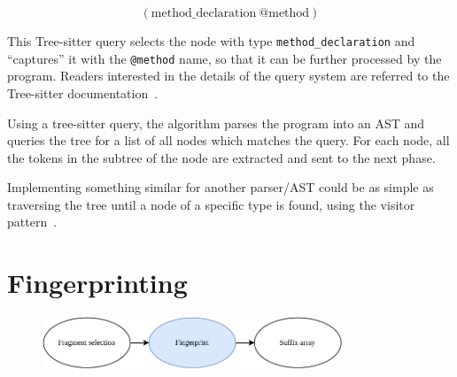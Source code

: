 \begin{equation}
    (\mathrm{method\_declaration\ } \text{@method})
\end{equation}

This Tree-sitter query selects the node with type \verb|method_declaration| and
``captures'' it with the \verb|@method| name, so that it can be further processed by the
program. Readers interested in the details of the query system are referred to the
Tree-sitter documentation~\cite{treesitter}.

Using a tree-sitter query, the algorithm parses the program into an AST and queries the
tree for a list of all nodes which matches the query. For each node, all the tokens in the
subtree of the node are extracted and sent to the next phase.

Implementing something similar for another parser/AST could be as simple as traversing the
tree until a node of a specific type is found, using the visitor
pattern~\cite[366]{GangOfFour}.


\section{Fingerprinting}

\begin{figure}[H]
    \begin{center}
        \includegraphics[width=0.8\textwidth]{figures/phases/phases_fingerprint.drawio.pdf}
    \end{center}
\end{figure}

